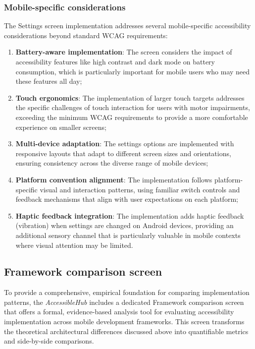 \subsubsection{Mobile-specific considerations}

The Settings screen implementation addresses several mobile-specific accessibility considerations beyond standard WCAG requirements:

\begin{enumerate}
    \item \textbf{Battery-aware implementation}: The screen considers the impact of accessibility features like high contrast and dark mode on battery consumption, which is particularly important for mobile users who may need these features all day;
    
    \item \textbf{Touch ergonomics}: The implementation of larger touch targets addresses the specific challenges of touch interaction for users with motor impairments, exceeding the minimum WCAG requirements to provide a more comfortable experience on smaller screens;
    
    \item \textbf{Multi-device adaptation}: The settings options are implemented with responsive layouts that adapt to different screen sizes and orientations, ensuring consistency across the diverse range of mobile devices;
    
    \item \textbf{Platform convention alignment}: The implementation follows platform-specific visual and interaction patterns, using familiar switch controls and feedback mechanisms that align with user expectations on each platform;
    
    \item \textbf{Haptic feedback integration}: The implementation adds haptic feedback (vibration) when settings are changed on Android devices, providing an additional sensory channel that is particularly valuable in mobile contexts where visual attention may be limited.
\end{enumerate}

\subsection{Framework comparison screen}

To provide a comprehensive, empirical foundation for comparing implementation patterns, the \textit{AccessibleHub} includes a dedicated Framework comparison screen that offers a formal, evidence-based analysis tool for evaluating accessibility implementation across mobile development frameworks. This screen transforms the theoretical architectural differences discussed above into quantifiable metrics and side-by-side comparisons.

